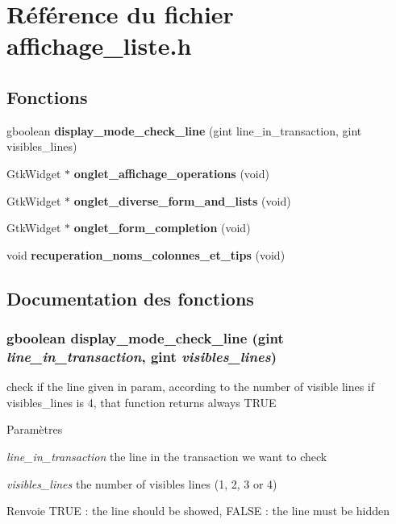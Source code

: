 \section{Référence du fichier affichage\_\-liste.h}
\label{affichage__liste_8h}
\subsection*{Fonctions}
\begin{DoxyCompactItemize}
\item 
gboolean {\bf display\_\-mode\_\-check\_\-line} (gint line\_\-in\_\-transaction, gint visibles\_\-lines)
\item 
GtkWidget $\ast$ {\bf onglet\_\-affichage\_\-operations} (void)
\item 
GtkWidget $\ast$ {\bf onglet\_\-diverse\_\-form\_\-and\_\-lists} (void)
\item 
GtkWidget $\ast$ {\bf onglet\_\-form\_\-completion} (void)
\item 
void {\bf recuperation\_\-noms\_\-colonnes\_\-et\_\-tips} (void)
\end{DoxyCompactItemize}


\subsection{Documentation des fonctions}
\subsubsection[{display\_\-mode\_\-check\_\-line}]{\setlength{\rightskip}{0pt plus 5cm}gboolean display\_\-mode\_\-check\_\-line (gint {\em line\_\-in\_\-transaction}, \/  gint {\em visibles\_\-lines})}\label{affichage__liste_8h_a29ff0d6bb71d4f22c3cfb6fc8d58d0a3}
check if the line given in param, according to the number of visible lines if visibles\_\-lines is 4, that function returns always TRUE


\begin{DoxyParams}{Paramètres}
\item[{\em line\_\-in\_\-transaction}]the line in the transaction we want to check \item[{\em visibles\_\-lines}]the number of visibles lines (1, 2, 3 or 4)\end{DoxyParams}
\begin{DoxyReturn}{Renvoie}
TRUE : the line should be showed, FALSE : the line must be hidden 
\end{DoxyReturn}


